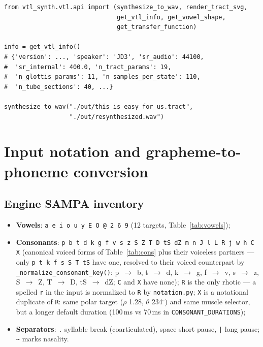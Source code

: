 \documentclass[11pt,a4paper]{article}
\newcommand{\turnh}{{\ipafont\symbol{"0265}}}
\begin{document}
\noindent\begin{minipage}{\linewidth}
\begin{lstlisting}[style=python]
from vtl_synth.vtl.api import (synthesize_to_wav, render_tract_svg,
                               get_vtl_info, get_vowel_shape,
                               get_transfer_function)

info = get_vtl_info()
# {'version': ..., 'speaker': 'JD3', 'sr_audio': 44100,
#  'sr_internal': 400.0, 'n_tract_params': 19,
#  'n_glottis_params': 11, 'n_samples_per_state': 110,
#  'n_tube_sections': 40, ...}

synthesize_to_wav("./out/this_is_easy_for_us.tract",
                  "./out/resynthesized.wav")
\end{lstlisting}
\end{minipage}

\section{Input notation and grapheme-to-phoneme conversion}\label{sec:notation}

\subsection{Engine SAMPA inventory}

\begin{itemize}[leftmargin=1.5em]
\item \textbf{Vowels}: \texttt{a e i o u y E O @ 2 6 9}
      (12 targets, Table~\ref{tab:vowels});
\item \textbf{Consonants}: \texttt{p b t d k g f v s z S Z T D tS dZ m n
      J l L R j w h \turnh{} C X} (canonical voiced forms of
      Table~\ref{tab:cons} plus their voiceless partners --- only
      \texttt{p t k f s S T tS} have one, resolved to their voiced
      counterpart by \texttt{\_normalize\_consonant\_key()}: p~$\to$~b,
      t~$\to$~d, k~$\to$~g, f~$\to$~v, s~$\to$~z, S~$\to$~Z,
      T~$\to$~D, tS~$\to$~dZ; \texttt{C} and \texttt{X} have none);
      \texttt{R} is the only rhotic --- a spelled \texttt{r} in the
      input is normalized to \texttt{R} by \texttt{notation.py};
      \texttt{X} is a notational duplicate of \texttt{R}: same polar
      target ($\rho$ 1.28, $\theta$ 234$^\circ$) and same muscle
      selector, but a longer default duration (100\,ms vs 70\,ms in
      \texttt{CONSONANT\_DURATIONS});
\item \textbf{Separators}: \texttt{.} syllable break (coarticulated),
      space short pause, \texttt{|} long pause; \texttt{\~{}} marks
      nasality.
\end{itemize}
\end{document}
